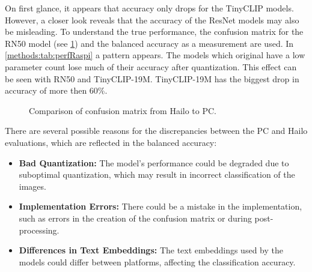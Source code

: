 On first glance, it appears that accuracy only drops for the TinyCLIP models.
However, a closer look reveals that the accuracy of the ResNet models may also be misleading.
To understand the true performance, the confusion matrix for the RN50 model (see \cref{methods:fig:compareConfM}) and the balanced accuracy as a measurement are used.
In \cref{methods:tab:perfRaspi} a pattern appears.
The models which original have a low parameter count lose much of their accuracy after quantization.
This effect can be seen with RN50 and TinyCLIP-19M.
TinyCLIP-19M has the biggest drop in accuracy of more then 60\%.


\begin{figure}[!h]
    \centering
    \label{methods:fig:compareConfM}
    \caption{Comparison of confusion matrix from Hailo to PC.}
\end{figure}

There are several possible reasons for the discrepancies between the PC and Hailo evaluations, which are reflected in the balanced accuracy:
\begin{itemize}
    \item \textbf{Bad Quantization:} The model's performance could be degraded due to suboptimal quantization, which may result in incorrect classification of the images.
    \item \textbf{Implementation Errors:} There could be a mistake in the implementation, such as errors in the creation of the confusion matrix or during post-processing.
    \item \textbf{Differences in Text Embeddings:} The text embeddings used by the models could differ between platforms, affecting the classification accuracy.
\end{itemize}

